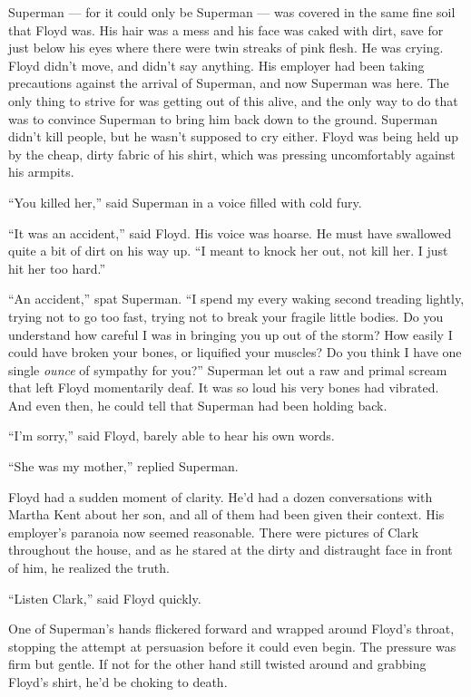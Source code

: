 Superman --- for it could only be Superman --- was covered in the same
fine soil that Floyd was. His hair was a mess and his face was caked
with dirt, save for just below his eyes where there were twin streaks of
pink flesh. He was crying. Floyd didn't move, and didn't say anything.
His employer had been taking precautions against the arrival of
Superman, and now Superman was here. The only thing to strive for was
getting out of this alive, and the only way to do that was to convince
Superman to bring him back down to the ground. Superman didn't kill
people, but he wasn't supposed to cry either. Floyd was being held up by
the cheap, dirty fabric of his shirt, which was pressing uncomfortably
against his armpits.

``You killed her,'' said Superman in a voice filled with cold fury.

``It was an accident,'' said Floyd. His voice was hoarse. He must have
swallowed quite a bit of dirt on his way up. ``I meant to knock her out,
not kill her. I just hit her too hard.''

``An accident,'' spat Superman. ``I spend my every waking second
treading lightly, trying not to go too fast, trying not to break your
fragile little bodies. Do you understand how careful I was in bringing
you up out of the storm? How easily I could have broken your bones, or
liquified your muscles? Do you think I have one single \emph{ounce} of
sympathy for you?'' Superman let out a raw and primal scream that left
Floyd momentarily deaf. It was so loud his very bones had vibrated. And
even then, he could tell that Superman had been holding back.

``I'm sorry,'' said Floyd, barely able to hear his own words.

``She was my mother,'' replied Superman.

Floyd had a sudden moment of clarity. He'd had a dozen conversations
with Martha Kent about her son, and all of them had been given their
context. His employer's paranoia now seemed reasonable. There were
pictures of Clark throughout the house, and as he stared at the dirty
and distraught face in front of him, he realized the truth.

``Listen Clark,'' said Floyd quickly.

One of Superman's hands flickered forward and wrapped around Floyd's
throat, stopping the attempt at persuasion before it could even begin.
The pressure was firm but gentle. If not for the other hand still
twisted around and grabbing Floyd's shirt, he'd be choking to death.

